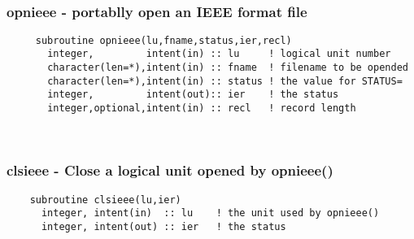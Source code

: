 \mbox{}\hrulefill\ 

  \subsubsection{opnieee - portablly open an IEEE format file}
%
%  
  
\begin{verbatim} 
     subroutine opnieee(lu,fname,status,ier,recl)
       integer,         intent(in) :: lu     ! logical unit number
       character(len=*),intent(in) :: fname  ! filename to be opended
       character(len=*),intent(in) :: status ! the value for STATUS=
       integer,         intent(out):: ier    ! the status
       integer,optional,intent(in) :: recl   ! record length
 \end{verbatim}%
 
 
\mbox{}\hrulefill\ 
 
  \subsubsection{clsieee - Close a logical unit opened by opnieee()}

%  
\begin{verbatim} 
 	subroutine clsieee(lu,ier)
 	  integer, intent(in)  :: lu	! the unit used by opnieee()
 	  integer, intent(out) :: ier	! the status
 \end{verbatim}%
 
